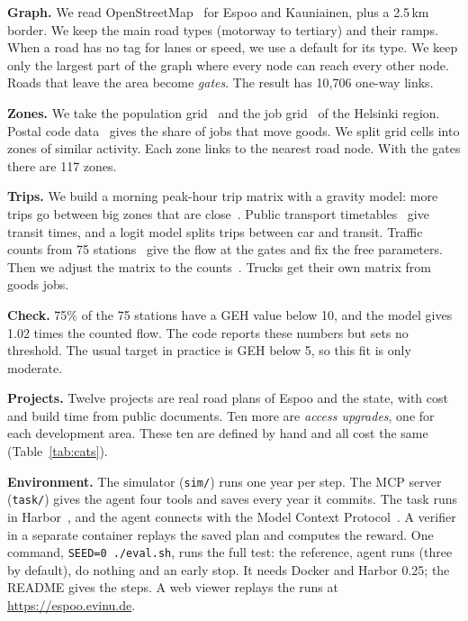 \documentclass{article}
\begin{document}
\textbf{Graph.} We read OpenStreetMap~\cite{haklay2008} for Espoo and Kauniainen, plus a 2.5\,km border. We keep the main road types (motorway to tertiary) and their ramps. When a road has no tag for lanes or speed, we use a default for its type. We keep only the largest part of the graph where every node can reach every other node. Roads that leave the area become \emph{gates}. The result has 10{,}706 one-way links.

\textbf{Zones.} We take the population grid~\cite{hsy2026a} and the job grid~\cite{hsy2026b} of the Helsinki region. Postal code data~\cite{statfi2026} gives the share of jobs that move goods. We split grid cells into zones of similar activity. Each zone links to the nearest road node. With the gates there are 117 zones.

\textbf{Trips.} We build a morning peak-hour trip matrix with a gravity model: more trips go between big zones that are close~\cite{ortuzar2011}. Public transport timetables~\cite{hsl2026} give transit times, and a logit model splits trips between car and transit. Traffic counts from 75 stations~\cite{fintraffic2026} give the flow at the gates and fix the free parameters. Then we adjust the matrix to the counts~\cite{vanzuylen1980}. Trucks get their own matrix from goods jobs.

\textbf{Check.} 75\% of the 75 stations have a GEH value below 10, and the model gives 1.02 times the counted flow. The code reports these numbers but sets no threshold. The usual target in practice is GEH below 5, so this fit is only moderate.

\textbf{Projects.} Twelve projects are real road plans of Espoo and the state, with cost and build time from public documents. Ten more are \emph{access upgrades}, one for each development area. These ten are defined by hand and all cost the same (Table~\ref{tab:cats}).

\textbf{Environment.} The simulator (\texttt{sim/}) runs one year per step. The MCP server (\texttt{task/}) gives the agent four tools and saves every year it commits. The task runs in Harbor~\cite{harbor2026}, and the agent connects with the Model Context Protocol~\cite{anthropic2024}. A verifier in a separate container replays the saved plan and computes the reward. One command, \texttt{SEED=0 ./eval.sh}, runs the full test: the reference, agent runs (three by default), do nothing and an early stop. It needs Docker and Harbor 0.25; the README gives the steps. A web viewer replays the runs at \url{https://espoo.evinu.de}.
\end{document}
